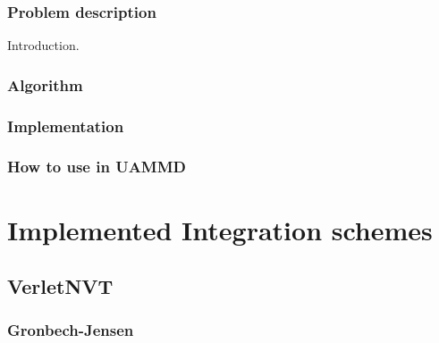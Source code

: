 \documentclass[ twoside,openright,titlepage,numbers=noenddot,%
headinclude,footinclude,cleardoublepage=empty,abstract=on,
BCOR=5mm,paper=a4,fontsize=11pt
]{scrreprt}
\begin{document}
\section{Problem description}
Introduction.
\section{Algorithm}

\section{Implementation}

\section{How to use in UAMMD}

\newpage
\newpage
\cleardoublepage
\part{Implemented Integration schemes}\label{pt:integrators}

\chapter{VerletNVT}
\section{Gronbech-Jensen}
\end{document}

